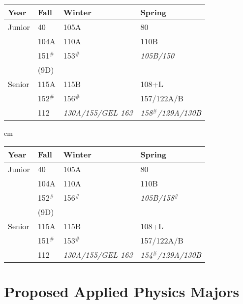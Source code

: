\documentclass[12pt]{article}
\begin{document}
\newpage
{}
  \label{tbl:proposed-astro}
\begin{center}
\begin{tabular}{|l|l|l|l|}
\hline
Year      & Fall    & Winter & Spring \\
\hline
Junior    & 40         & 105A     & 80 \\
          & 104A       & 110A     & 110B \\
          & 151$^\#$   & 153$^\#$ & {\it 105B/150} \\         
          & (9D)       &             &  \\         
\hline
Senior   & 115A     & 115B & 108+L\\
         & 152$^\#$ & 156$^\#$ & 157/122A/B \\
         & 112   & {\it 130A/155/GEL 163} & {\it 158$^\#$/129A/130B} \\
\hline 
\end{tabular}

 cm

\begin{tabular}{|l|l|l|l|}
\hline
Year      & Fall    & Winter & Spring \\
\hline
Junior    & 40         & 105A     & 80 \\
          & 104A       & 110A     & 110B \\
          & 152$^\#$   & 156$^\#$ & {\it 105B/158$^\#$} \\         
          & (9D)       &             &  \\         
\hline
Senior   & 115A     & 115B & 108+L\\
         & 151$^\#$ & 153$^\#$ & 157/122A/B \\
         & 112   & {\it 130A/155/GEL 163} & {\it 154$^\#$/129A/130B} \\
\hline 
\end{tabular}
\vskip 0.5cm
\end{center}

\newpage
\section{Proposed Applied Physics Majors}
\end{document}
